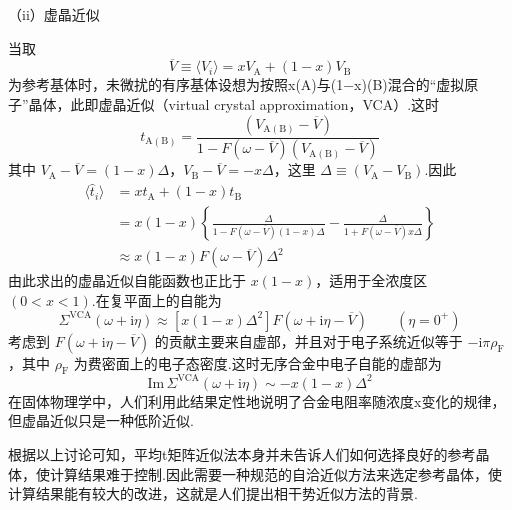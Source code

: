 （ii）虚晶近似

当取
\begin{equation}
  \overline{V}\equiv\langle V_{i}\rangle=xV_{\mathrm{A}}+\left(1-x\right)V_{\mathrm{B}}
\end{equation}
为参考基体时，未微扰的有序基体设想为按照x(A)与(1−x)(B)混合的“虚拟原子”晶体，此即虚晶近似（virtual crystal approximation，VCA）.这时
\begin{equation}
  t_{\mathrm{A}(\mathrm{B})}
  =\frac{\left(V_{\mathrm{A}(\mathrm{B})}-\overline{V}\right)}
  {1-F\left(\omega-\overline{V}\right)\left(V_{\mathrm{A}(\mathrm{B})}-\overline{V}\right)}
\end{equation}
其中 $V_{\mathrm{A}}-\overline{V}=\left(1-x\right)\Delta$，$V_{\mathrm{B}}-\overline{V}=-x\Delta$，这里 $\Delta\equiv\left(V_{\mathrm{A}}-V_{\mathrm{B}}\right)$.因此
\begin{equation}
\begin{aligned}
  \langle\hat{t}_{i}\rangle&=xt_{\mathrm{A}}+\left(1-x\right)t_{\mathrm{B}}\\
  &=x\left(1-x\right)\left\{
  \frac{\Delta}{1-F\left(\omega-\overline{V}\right)\left(1-x\right)\Delta}
  -\frac{\Delta}{1+F\left(\omega-\overline{V}\right)x\Delta}\right\}\\
  &\approx x\left(1-x\right)F\left(\omega-\overline{V}\right)\Delta^{2}
\end{aligned}
\end{equation}
由此求出的虚晶近似自能函数也正比于 $x\left(1-x\right)$，适用于全浓度区 $\left(0<x<1\right)$.在复平面上的自能为
\begin{equation*}
  \Sigma^{\mathrm{VCA}}\left(\omega+\mathrm{i}\eta\right)
  \approx\left[x\left(1-x\right)\Delta^{2}\right]
  F\left(\omega+\mathrm{i}\eta-\overline{V}\right)
  \qquad\left(\eta=0^{+}\right)
\end{equation*}
考虑到 $F\left(\omega+\mathrm{i}\eta-\overline{V}\right)$ 的贡献主要来自虚部，并且对于电子系统近似等于 $-\mathrm{i}\pi\rho_{\mathrm{F}}$，其中 $\rho_{\mathrm{F}}$ 为费密面上的电子态密度.这时无序合金中电子自能的虚部为
\begin{equation*}
  \mathrm{Im}\,\Sigma^{\mathrm{VCA}}\left(\omega+\mathrm{i}\eta\right)
  \sim-x\left(1-x\right)\Delta^{2}
\end{equation*}
在固体物理学中，人们利用此结果定性地说明了合金电阻率随浓度x变化的规律，但虚晶近似只是一种低阶近似.

根据以上讨论可知，平均t矩阵近似法本身并未告诉人们如何选择良好的参考晶体，使计算结果难于控制.因此需要一种规范的自洽近似方法来选定参考晶体，使计算结果能有较大的改进，这就是人们提出相干势近似方法的背景.

